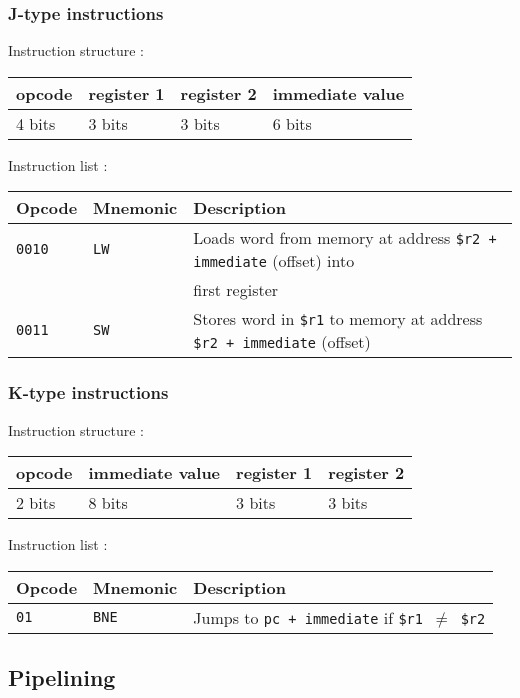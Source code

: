 \documentclass[a4paper]{report}
\begin{document}
\subsubsection{J-type instructions}

Instruction structure :

\begin{center}
	\begin{tabular}{|l|l|l|l|}
		\hline
		opcode & register 1 & register 2 & immediate value \\
		\hline
		4 bits & 3 bits & 3 bits & 6 bits \\
		\hline
	\end{tabular}
\end{center}

Instruction list :

\begin{center}
	\begin{tabular}{|l|l|l|}
		\hline
		Opcode & Mnemonic & Description \\
		\hline \hline
		\texttt{0010} & \texttt{LW} & Loads word from memory at address
		                              \texttt{\$r2 + immediate} (offset) into \\
		              &             & first register \\
		\texttt{0011} & \texttt{SW} & Stores word in \texttt{\$r1} to memory at
		                           address \texttt{\$r2 + immediate} (offset) \\
		\hline
	\end{tabular}
\end{center}

\subsubsection{K-type instructions}

Instruction structure :

\begin{center}
	\begin{tabular}{|l|l|l|l|}
		\hline
		opcode & immediate value & register 1 & register 2 \\
		\hline
		2 bits & 8 bits & 3 bits & 3 bits \\
		\hline
	\end{tabular}
\end{center}

Instruction list :

\begin{center}
	\begin{tabular}{|l|l|l|}
		\hline
		Opcode & Mnemonic & Description \\
		\hline \hline
		\texttt{01} & \texttt{BNE} & Jumps to \texttt{pc + immediate} if
		                             \texttt{\$r1 $\neq$ \$r2} \\
		\hline
	\end{tabular}
\end{center}

\subsection{Pipelining}
\end{document}
